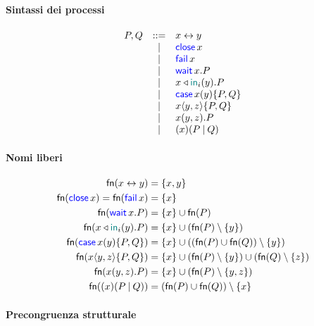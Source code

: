 \documentclass[a4paper]{article}
\title{\Calculus}
\date{}
\begin{document}
\maketitle

\paragraph{Sintassi dei processi}

\[
    \begin{array}{rcll}
        P, Q & ::= & x\leftrightarrow y \\
            & | & \mathsf{\color{blue}close}\,x \\
            & | & \mathsf{\color{blue}fail}\,x \\
            & | & \mathsf{\color{blue}wait}\,x.P \\
            & | & x \triangleleft \mathsf{\color{teal}in}_i(y).P \\
            & | & \mathsf{\color{blue}case}\,x(y)\{P,Q\} \\
            & | & x\langle y,z\rangle\{P,Q\} \\
            & | & x(y,z).P \\
            & | & (x)(P\mathbin| Q) \\
    \end{array}
\]

\paragraph{Nomi liberi}

\begin{align*}
    \mathsf{fn}(x\leftrightarrow y) & = \{x,y\} \\
    \mathsf{fn}(\mathsf{\color{blue}close}\,x) = \mathsf{fn}(\mathsf{\color{blue}fail}\,x) & = \{x\} \\
    \mathsf{fn}(\mathsf{\color{blue}wait}\,x.P) & = \{x\} \cup \mathsf{fn}(P) \\
    \mathsf{fn}(x \triangleleft \mathsf{\color{teal}in}_i(y).P) & = \{x\} \cup (\mathsf{fn}(P) \setminus \{y\}) \\
    \mathsf{fn}(\mathsf{\color{blue}case}\,x(y)\{P,Q\}) & = \{x\} \cup ((\mathsf{fn}(P) \cup \mathsf{fn}(Q)) \setminus \{y\}) \\
    \mathsf{fn}(x\langle y,z\rangle\{P,Q\}) & = \{x\} \cup (\mathsf{fn}(P) \setminus \{y\}) \cup (\mathsf{fn}(Q) \setminus \{z\}) \\
    \mathsf{fn}(x(y,z).P) & = \{x\} \cup (\mathsf{fn}(P) \setminus \{y,z\}) \\
    \mathsf{fn}((x)(P\mathbin| Q)) & = (\mathsf{fn}(P) \cup \mathsf{fn}(Q)) \setminus \{x\} \\
\end{align*}

\paragraph{Precongruenza strutturale}
\end{document}

